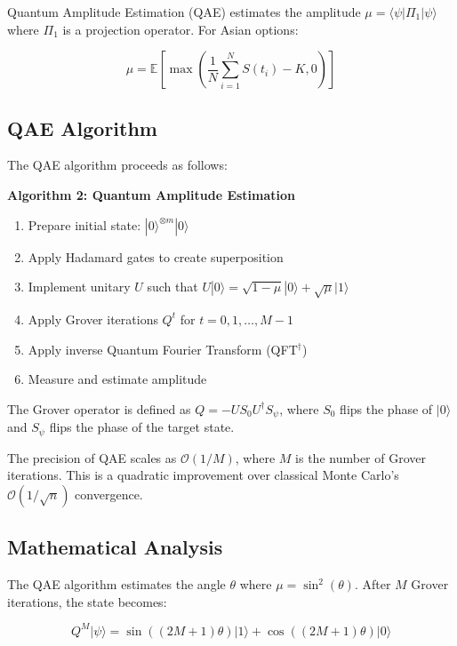 \documentclass[12pt]{article}
\begin{document}
Quantum Amplitude Estimation (QAE) estimates the amplitude $\mu = \langle \psi | \Pi_1 | \psi \rangle$ where $\Pi_1$ is a projection operator. For Asian options:

\begin{equation}
\mu = \mathbb{E}\left[\max\left(\frac{1}{N}\sum_{i=1}^{N} S(t_i) - K, 0\right)\right]
\end{equation}

\subsection{QAE Algorithm}

The QAE algorithm proceeds as follows:

\textbf{Algorithm 2: Quantum Amplitude Estimation}

\begin{enumerate}
    \item Prepare initial state: $|0\rangle^{\otimes m} |0\rangle$
    \item Apply Hadamard gates to create superposition
    \item Implement unitary $U$ such that $U|0\rangle = \sqrt{1-\mu}|0\rangle + \sqrt{\mu}|1\rangle$
    \item Apply Grover iterations $Q^t$ for $t = 0, 1, \dots, M-1$
    \item Apply inverse Quantum Fourier Transform (QFT$^\dagger$)
    \item Measure and estimate amplitude
\end{enumerate}

The Grover operator is defined as $Q = -U S_0 U^\dagger S_\psi$, where $S_0$ flips the phase of $|0\rangle$ and $S_\psi$ flips the phase of the target state.

The precision of QAE scales as $\mathcal{O}(1/M)$, where $M$ is the number of Grover iterations. This is a quadratic improvement over classical Monte Carlo's $\mathcal{O}(1/\sqrt{n})$ convergence.

\subsection{Mathematical Analysis}

The QAE algorithm estimates the angle $\theta$ where $\mu = \sin^2(\theta)$. After $M$ Grover iterations, the state becomes:

\begin{equation}
Q^M | \psi \rangle = \sin((2M+1)\theta) |1\rangle + \cos((2M+1)\theta) |0\rangle
\end{equation}
\end{document}
